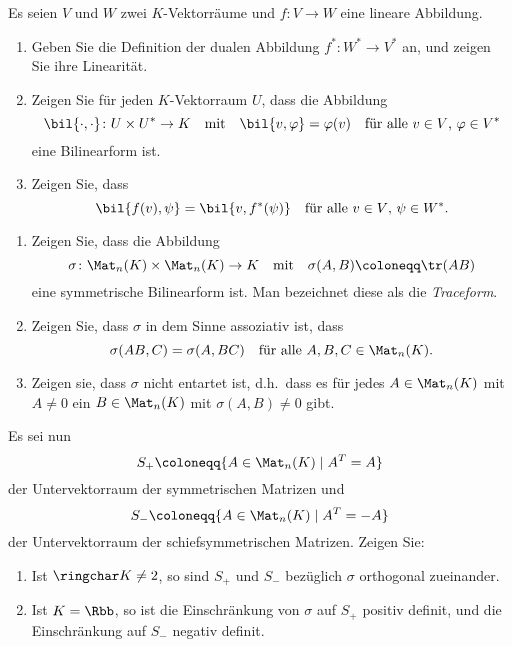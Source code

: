 \begin{question}
  Es seien $V$ und $W$ zwei $K$-Vektorräume und $f \colon V \to W$ eine lineare Abbildung.
  \begin{enumerate}[leftmargin=*]
    \item
      Geben Sie die Definition der dualen Abbildung $f^* \colon W^* \to V^*$ an, und zeigen Sie ihre Linearität.
    \item
      Zeigen Sie für jeden $K$-Vektorraum $U$, dass die Abbildung
      \[
        \bil{\cdot, \cdot} \colon U \times U^* \to K
        \quad\text{mit}\quad
        \bil{v, \varphi} = \varphi(v)
        \quad\text{für alle $v \in V$, $\varphi \in V^*$}
      \]
      eine Bilinearform ist.
    \item
      Zeigen Sie, dass
      \[
        \bil{f(v), \psi} = \bil{v, f^*(\psi)}
        \quad
        \text{für alle $v \in V$, $\psi \in W^*$}.
      \]
  \end{enumerate}
\end{question}


\begin{question}
  \begin{enumerate}[leftmargin=*]
    \item
      Zeigen Sie, dass die Abbildung
      \[
        \sigma \colon \Mat_n(K) \times \Mat_n(K) \to K
        \quad\text{mit}\quad
        \sigma(A, B) \coloneqq \tr(AB)
      \]
      eine symmetrische Bilinearform ist.
      Man bezeichnet diese als die \emph{Traceform}.
    \item
      Zeigen Sie, dass $\sigma$ in dem Sinne assoziativ ist, dass
      \[
        \sigma(AB, C) = \sigma(A, BC)
        \quad
        \text{für alle $A, B, C \in \Mat_n(K)$}.
      \]
    \item
      Zeigen sie, dass $\sigma$ nicht entartet ist, d.h.\ dass es für jedes $A \in \Mat_n(K)$ mit $A \neq 0$ ein $B \in \Mat_n(K)$ mit $\sigma(A, B) \neq 0$ gibt.
  \end{enumerate}
  Es sei nun
  \[
    S_+ \coloneqq \{ A \in \Mat_n(K) \mid A^T = A \}
  \]
  der Untervektorraum der symmetrischen Matrizen und
  \[
    S_- \coloneqq \{ A \in \Mat_n(K) \mid A^T = -A \}
  \]
  der Untervektorraum der schiefsymmetrischen Matrizen.
  Zeigen Sie:
  \begin{enumerate}[leftmargin=*, resume]
    \item
      Ist $\ringchar K \neq 2$, so sind $S_+$ und $S_-$ bezüglich $\sigma$ orthogonal zueinander.
    \item
      Ist $K = \Rbb$, so ist die Einschränkung von $\sigma$ auf $S_+$ positiv definit, und die Einschränkung auf $S_-$ negativ definit.
  \end{enumerate}
\end{question}


